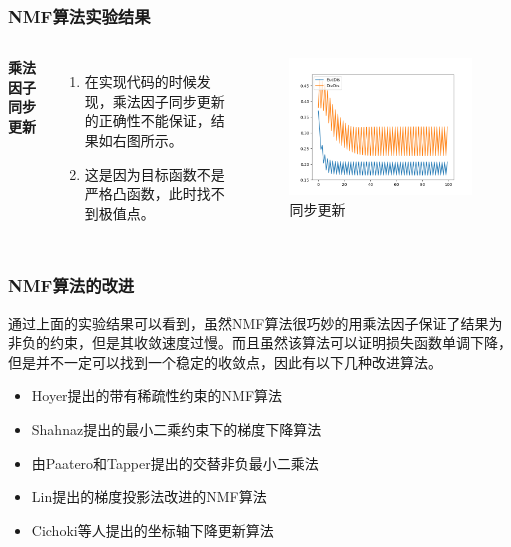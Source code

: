 \documentclass[UTF8,mathserif]{beamer}
\begin{document}
\begin{frame}
\frametitle{NMF算法实验结果}
\begin{columns}[c] %
	
	\textbf{乘法因子同步更新}
	\begin{enumerate}
		\item 在实现代码的时候发现，乘法因子同步更新的正确性不能保证，结果如右图所示。
		\item 这是因为目标函数不是严格凸函数，此时找不到极值点。
	\end{enumerate}
	
	\begin{figure}[h]%
		\centering  %
		\includegraphics[width=1.2\linewidth]{image/Fail_answer}  %
		\caption{同步更新}  %
		\label{fig:mcmthesis-logo}   %
	\end{figure}
	
	
\end{columns}
\end{frame}


\begin{frame}
\frametitle{NMF算法的改进}
\indent 通过上面的实验结果可以看到，虽然NMF算法很巧妙的用乘法因子保证了结果为非负的约束，但是其收敛速度过慢。而且虽然该算法可以证明损失函数单调下降，但是并不一定可以找到一个稳定的收敛点，因此有以下几种改进算法。
\begin{itemize}
	\item Hoyer提出的带有稀疏性约束的NMF算法 
	\item Shahnaz提出的最小二乘约束下的梯度下降算法
	\item 由Paatero和Tapper提出的交替非负最小二乘法
	\item Lin提出的梯度投影法改进的NMF算法
	\item Cichoki等人提出的坐标轴下降更新算法
\end{itemize}
\end{frame}
\end{document}
